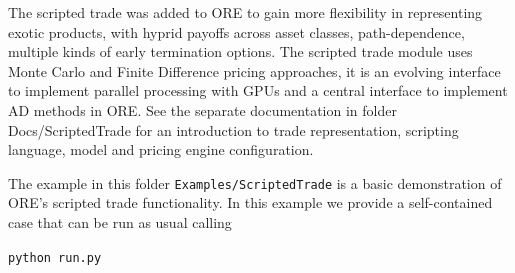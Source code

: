 The scripted trade was added to ORE to gain more flexibility in representing exotic products, with hyprid payoffs across
asset classes, path-dependence, multiple kinds of early termination options. The scripted trade module uses Monte Carlo and
Finite Difference pricing approaches, it is an evolving interface to implement parallel processing with GPUs and a central
interface to implement AD methods in ORE. See the separate documentation in folder Docs/ScriptedTrade for an introduction to trade
representation, scripting language, model and pricing engine configuration. 

\medskip
The example in this folder {\tt Examples/ScriptedTrade} is a basic demonstration of ORE's scripted trade functionality.
In this example we provide a self-contained case that can be run as usual calling

\medskip
\centerline{\tt python run.py}

\medskip

